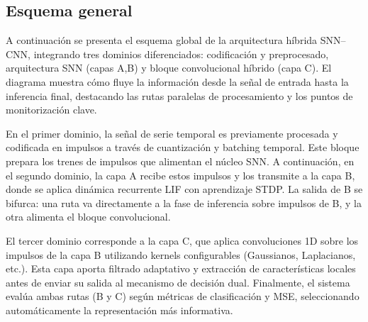 



    
\subsection{Esquema general}

A continuación se presenta el esquema global de la arquitectura híbrida SNN–CNN, integrando tres dominios diferenciados: codificación y preprocesado, arquitectura SNN (capas A,B) y bloque convolucional híbrido (capa C). El diagrama muestra cómo fluye la información desde la señal de entrada hasta la inferencia final, destacando las rutas paralelas de procesamiento y los puntos de monitorización clave.

En el primer dominio, la señal de serie temporal es previamente procesada y codificada en impulsos a través de cuantización y batching temporal. Este bloque prepara los trenes de impulsos que alimentan el núcleo SNN. A continuación, en el segundo dominio, la capa A recibe estos impulsos y los transmite a la capa B, donde se aplica dinámica recurrente LIF con aprendizaje STDP. La salida de B se bifurca: una ruta va directamente a la fase de inferencia sobre impulsos de B, y la otra alimenta el bloque convolucional.

El tercer dominio corresponde a la capa C, que aplica convoluciones 1D sobre los impulsos de la capa B utilizando kernels configurables (Gaussianos, Laplacianos, etc.). Esta capa aporta filtrado adaptativo y extracción de características locales antes de enviar su salida al mecanismo de decisión dual. Finalmente, el sistema evalúa ambas rutas (B y C) según métricas de clasificación y MSE, seleccionando automáticamente la representación más informativa.

